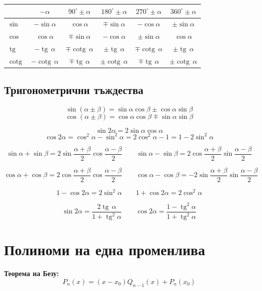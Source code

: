 \documentclass[12pt,a4paper]{article}
\renewcommand{\tg}{\operatorname{tg}}
\newcommand{\cotg}{\operatorname{cotg}}
\begin{document}
\begin{center}
\renewcommand{\arraystretch}{1.6}
\begin{tabular}{l*{5}{c}}
\toprule
 & $-\alpha$ & $90^\circ\pm\alpha$ & $180^\circ\pm\alpha$ & $270^\circ\pm\alpha$ & $360^\circ\pm\alpha$ \\
\midrule
$\sin$ & $-\sin\alpha$ & $\cos\alpha$ & $\mp\sin\alpha$ & $-\cos\alpha$ & $\pm\sin\alpha$ \\
$\cos$ & $\cos\alpha$ & $\mp\sin\alpha$ & $-\cos\alpha$ & $\pm\sin\alpha$ & $\cos\alpha$ \\
$\tg$ & $-\tg\,\alpha$ & $\mp\cotg\,\alpha$ & $\pm\tg\,\alpha$ & $\mp\cotg\,\alpha$ & $\pm\tg\,\alpha$ \\
$\cotg$ & $-\cotg\,\alpha$ & $\mp\tg\,\alpha$ & $\pm\cotg\,\alpha$ & $\mp\tg\,\alpha$ & $\pm\cotg\,\alpha$ \\
\bottomrule
\end{tabular}
\end{center}

\subsection{Тригонометрични тъждества}

$$\sin(\alpha\pm\beta)=\sin\alpha\cos\beta\pm\cos\alpha\sin\beta$$
$$\cos(\alpha\pm\beta)=\cos\alpha\cos\beta\mp\sin\alpha\sin\beta$$

$$\sin 2\alpha = 2\sin\alpha\cos\alpha$$
$$\cos 2\alpha = \cos^2\alpha-\sin^2\alpha = 2\cos^2\alpha-1 = 1-2\sin^2\alpha$$

$$\sin\alpha+\sin\beta=2\sin\frac{\alpha+\beta}{2}\cos\frac{\alpha-\beta}{2} \qquad
\sin\alpha-\sin\beta=2\cos\frac{\alpha+\beta}{2}\sin\frac{\alpha-\beta}{2}$$

$$\cos\alpha+\cos\beta=2\cos\frac{\alpha+\beta}{2}\cos\frac{\alpha-\beta}{2} \qquad
\cos\alpha-\cos\beta=-2\sin\frac{\alpha+\beta}{2}\sin\frac{\alpha-\beta}{2}$$

$$1-\cos2\alpha=2\sin^2\alpha \qquad 1+\cos2\alpha=2\cos^2\alpha$$

$$\sin2\alpha=\frac{2\tg\,\alpha}{1+\tg^2\alpha} \qquad \cos2\alpha=\frac{1-\tg^2\alpha}{1+\tg^2\alpha}$$

\section{Полиноми на една променлива}

\textbf{Теорема на Безу:}
$$P_n(x)=(x-x_0)Q_{n-1}(x)+P_n(x_0)$$
\end{document}
